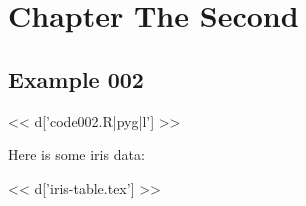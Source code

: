 \chapter{Chapter The Second}

\section{Example 002}

<< d['code002.R|pyg|l'] >>

Here is some iris data:

<< d['iris-table.tex'] >>


